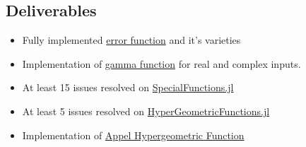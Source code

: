 \documentclass{article}
\theoremstyle{mytheoremstyle}
\theoremstyle{mytheoremstyle}
\theoremstyle{myproblemstyle}
\begin{document}
    \subsection*{Deliverables}
      \begin{itemize}
        \item Fully implemented \href{https://github.com/JuliaMath/SpecialFunctions.jl/blob/master/src/erf.jl}{error function} and it's varieties 
        \item Implementation of \href{https://github.com/JuliaMath/SpecialFunctions.jl/blob/master/src/gamma.jl}{gamma function} for real and complex inputs. 
        \item At least 15 issues resolved on \href{https://github.com/JuliaMath/SpecialFunctions.jl/issues}{SpecialFunctions.jl} 
        \item At least 5 issues resolved on \href{https://github.com/JuliaMath/HypergeometricFunctions.jl/issues}{HyperGeometricFunctions.jl} 
        \item Implementation of \href{https://en.wikipedia.org/wiki/Appell_series}{Appel Hypergeometric Function} 
      \end{itemize}
\end{document}

